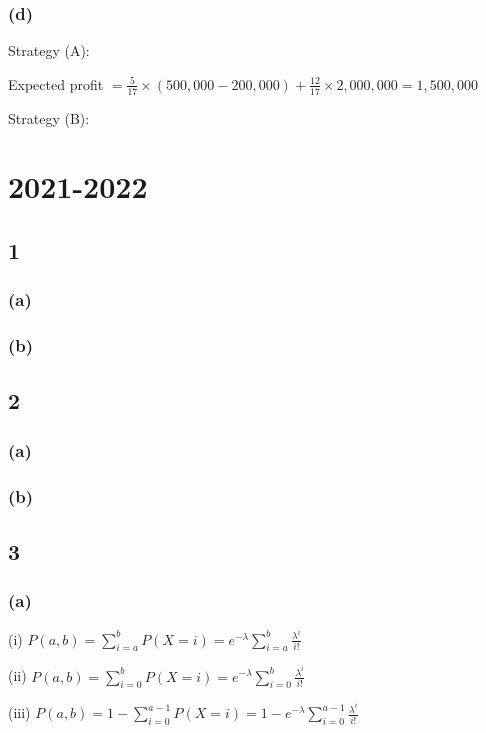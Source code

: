 \documentclass{article}
\begin{document}
\subsubsection*{(d)}
Strategy (A):\par
Expected profit $=\frac{5}{17} \times(500,000-200,000)+\frac{12}{17} \times2,000,000=1,500,000 $\par
Strategy (B):\par



\section*{2021-2022}
\subsection*{1}
\subsubsection*{(a)}
\subsubsection*{(b)}

\subsection*{2}
\subsubsection*{(a)}
\subsubsection*{(b)}

\subsection*{3}
\subsubsection*{(a)}
(i) $P(a,b)=\sum ^{b}_{i=a}P( X= i)=e^{-\lambda}\sum ^{b}_{i=a}\frac{\lambda^{i}}{i!}$\par
(ii) $P(a,b)=\sum ^{b}_{i=0}P( X= i)=e^{-\lambda}\sum ^{b}_{i=0}\frac{\lambda^{i}}{i!}$\par
(iii) $P(a,b)=1-\sum ^{a-1}_{i=0}P( X= i)=1-e^{-\lambda}\sum ^{a-1}_{i=0}\frac{\lambda^{i}}{i!}$\par
\end{document}
